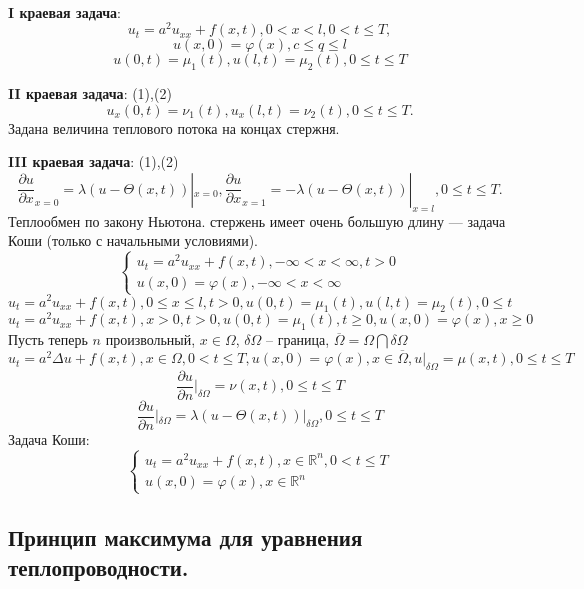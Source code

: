 \documentclass[9pt]{article}
\begin{document}
\ 
\par\textbf{I краевая задача}:
\begin{equation}
    u_t=a^2u_{xx}+f(x,t),0<x<l,0<t\le T,
\end{equation}
\begin{equation}
    u(x,0)=\varphi(x),c\le q\le l
\end{equation}
\begin{equation}
    u(0,t)=\mu_1(t),u(l,t)=\mu_2(t),0\le t\le T
\end{equation}
\par\textbf{II краевая задача}: (1),(2)
\begin{equation}
    u_x(0,t)=\nu_1(t),u_x(l,t)=\nu_2(t),0\le t\le T.
\end{equation}
Задана величина теплового потока на концах стержня.
\par\textbf{III краевая задача}: (1),(2)
\begin{equation}
    \dfrac{\partial u}{\partial x}_{x=0}=\lambda(u-\Theta(x,t))|_{x=0},
    \dfrac{\partial u}{\partial x}_{x=1}=-\lambda(u-\Theta(x,t))|_{x=l},0\le t\le T.
\end{equation}
Теплообмен по закону Ньютона.
 стержень имеет очень большую длину --- задача Коши (только с начальными условиями).
\[\left\{
\begin{array}{l}
    u_t=a^2u_{xx}+f(x,t),-\infty<x<\infty,t>0 \\
    u(x,0)=\varphi(x),-\infty<x<\infty
\end{array}
\right.\]
\[u_t=a^2u_{xx}+f(x,t),0\le x\le l, t>0, u(0,t)=\mu_1(t),u(l,t)=\mu_2(t), 0\le t\]
\[u_t=a^2u_{xx}+f(x,t),x>0,t>0, u(0,t)=\mu_1(t),t\ge0, u(x,0)=\varphi(x),x\ge0\]
Пусть теперь \(n\) произвольный, \(x\in\Omega\), \(\delta\Omega\) -- граница, \(\overline{\Omega}=\Omega\bigcap\delta\Omega\)
\[u_t=a^2\Delta u+f(x,t),x\in\Omega,0<t\le T, u(x,0)=\varphi(x),x\in\overline{\Omega},u|_{\delta\Omega}=\mu(x,t),0\le t\le T\]
\[\dfrac{\partial u}{\partial n}|_{\delta\Omega}=\nu(x,t),0\le t\le T\]
\[\dfrac{\partial u}{\partial n}|_{\delta\Omega}=\lambda(u-\Theta(x,t))|_{\delta\Omega},0\le t\le T\]
Задача Коши:
\[\left\{\begin{array}{l}
    u_t=a^2u_{xx}+f(x,t),x\in\mathbb{R}^n,0<t\le T \\
    u(x,0)=\varphi(x),x\in\mathbb{R}^n
\end{array}\right.\]

\subsection{Принцип максимума для уравнения теплопроводности.}
\end{document}
